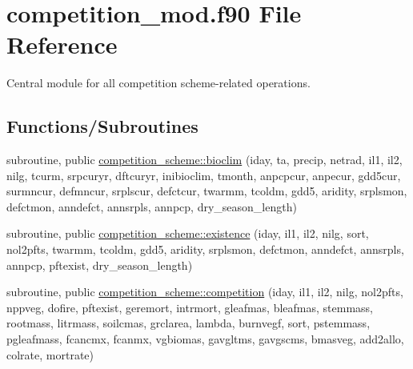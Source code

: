 \hypertarget{competition__mod_8f90}{}\section{competition\+\_\+mod.\+f90 File Reference}
\label{competition__mod_8f90}


Central module for all competition scheme-\/related operations.  


\subsection*{Functions/\+Subroutines}
{\bf }\par
\begin{DoxyCompactItemize}
\item 
subroutine, public \hyperlink{group__competition__scheme__bioclim_ga63e17c7f18b8ab7e782acf1b3d957dd8}{competition\+\_\+scheme\+::bioclim} (iday, ta, precip, netrad, il1, il2, nilg, tcurm, srpcuryr, dftcuryr, inibioclim, tmonth, anpcpcur, anpecur, gdd5cur, surmncur, defmncur, srplscur, defctcur, twarmm, tcoldm, gdd5, aridity, srplsmon, defctmon, anndefct, annsrpls, annpcp, dry\+\_\+season\+\_\+length)
\end{DoxyCompactItemize}

{\bf }\par
\begin{DoxyCompactItemize}
\item 
subroutine, public \hyperlink{group__competition__scheme__existence_ga4345a1807f52b8da4f0cdd9f0f71f91f}{competition\+\_\+scheme\+::existence} (iday, il1, il2, nilg, sort, nol2pfts, twarmm, tcoldm, gdd5, aridity, srplsmon, defctmon, anndefct, annsrpls, annpcp, pftexist, dry\+\_\+season\+\_\+length)
\end{DoxyCompactItemize}

{\bf }\par
\begin{DoxyCompactItemize}
\item 
subroutine, public \hyperlink{group__competition__scheme__competition_ga42c6fcccc542b3c3711cae7881d30665}{competition\+\_\+scheme\+::competition} (iday, il1, il2, nilg, nol2pfts, nppveg, dofire, pftexist, geremort, intrmort, gleafmas, bleafmas, stemmass, rootmass, litrmass, soilcmas, grclarea, lambda, burnvegf, sort, pstemmass, pgleafmass, fcancmx, fcanmx, vgbiomas, gavgltms, gavgscms, bmasveg, add2allo, colrate, mortrate)
\end{DoxyCompactItemize}



